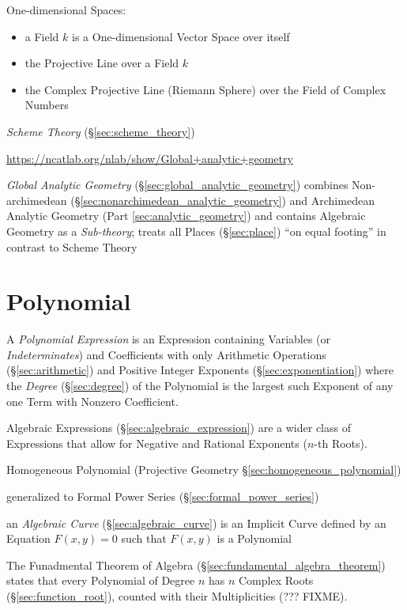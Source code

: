 One-dimensional Spaces:
\begin{itemize}
\item a Field $k$ is a One-dimensional Vector Space over itself
\item the Projective Line over a Field $k$
\item the Complex Projective Line (Riemann Sphere) over the Field of Complex
  Numbers
\end{itemize}

\emph{Scheme Theory} (\S\ref{sec:scheme_theory})

\url{https://ncatlab.org/nlab/show/Global+analytic+geometry}

\emph{Global Analytic Geometry} (\S\ref{sec:global_analytic_geometry}) combines
Non-archimedean (\S\ref{sec:nonarchimedean_analytic_geometry}) and Archimedean
Analytic Geometry (Part \ref{sec:analytic_geometry}) and contains Algebraic
Geometry as a \emph{Sub-theory}; treats all Places (\S\ref{sec:place}) ``on
equal footing'' in contrast to Scheme Theory



\section{Polynomial}\label{sec:polynomial}

A \emph{Polynomial Expression} is an Expression containing Variables (or
\emph{Indeterminates}) and Coefficients with only Arithmetic Operations
(\S\ref{sec:arithmetic}) and Positive Integer Exponents
(\S\ref{sec:exponentiation}) where the \emph{Degree} (\S\ref{sec:degree}) of
the Polynomial is the largest such Exponent of any one Term with Nonzero
Coefficient.

\fist Algebraic Expressions (\S\ref{sec:algebraic_expression}) are a wider
class of Expressions that allow for Negative and Rational Exponents ($n$-th
Roots).

\fist Homogeneous Polynomial (Projective Geometry
\S\ref{sec:homogeneous_polynomial})

\fist generalized to Formal Power Series (\S\ref{sec:formal_power_series})

\fist an \emph{Algebraic Curve} (\S\ref{sec:algebraic_curve}) is an Implicit
Curve defined by an Equation $F(x,y) = 0$ such that $F(x,y)$ is a Polynomial

The Funadmental Theorem of Algebra (\S\ref{sec:fundamental_algebra_theorem})
states that every Polynomial of Degree $n$ has $n$ Complex Roots
(\S\ref{sec:function_root}), counted with their Multiplicities (??? FIXME).

